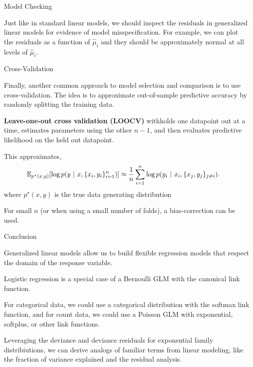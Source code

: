 \documentclass[aspectratio=169]{beamer}
\begin{document}
\begin{frame}[t,allowframebreaks]{Model Checking}\label{model-checking}

Just like in standard linear models, we should inspect the residuals in
generalized linear models for evidence of model misspecification. For
example, we can plot the residuals as a function of \(\hat{\mu}_i\) and
they should be approximately normal at all levels of \(\hat{\mu}_i\).
\end{frame}

\begin{frame}[t,allowframebreaks]{Cross-Validation}\label{cross-validation}

Finally, another common approach to model selection and comparison is to
use cross-validation. The idea is to approximate out-of-sample
predictive accuracy by randomly splitting the training data.

\textbf{Leave-one-out cross validation (LOOCV)} withholds one datapoint
out at a time, estimates parameters using the other \(n-1\), and then
evaluates predictive likelihood on the held out datapoint.

This approximates, \begin{align}
    \mathbb{E}_{p^\star(x, y)}[\log p(y ~\vert~ x, \{x_i, y_i\}_{i=1}^n)] &\approx
    \frac{1}{n} \sum_{i=1}^n \log p(y_i ~\vert~ x_i, \{x_j, y_j\}_{j \neq i}).
\end{align} where \(p^\star(x, y)\) is the true data generating
distribution

For small \(n\) (or when using a small number of folds), a
bias-correction can be used.


\end{frame}

\begin{frame}[t,allowframebreaks]{Conclusion}\label{conclusion}

Generalized linear models allow us to build flexible regression models that respect the domain of the response variable. 

Logistic regression is a special case of a Bernoulli GLM with the canonical link function. 

For categorical data, we could use a categorical distribution with the
softmax link function, and for count data, we could use a Poisson GLM
with exponential, softplus, or other link functions. 

Leveraging the deviance and deviance residuals for exponential family distribiutions,
we can derive analogs of familiar terms from linear modeling, like the
fraction of variance explained and the residual analysis.

\end{frame}
    
    
\end{document}
